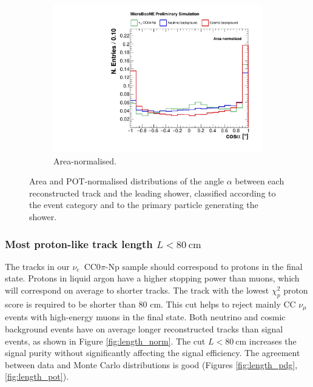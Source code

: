 \begin{figure}[htbp]
    \begin{subfigure}{0.49\textwidth}
    \includegraphics[width=\linewidth]{figures/h_track_shower_angle_norm.pdf}
    \caption{Area-normalised.} \label{fig:angle_integral}
  \end{subfigure}
  \caption{Area and POT-normalised distributions of the angle $\alpha$ between each reconstructed track and the leading shower, classified according to the event category and to the primary particle generating the shower.}
\end{figure}

\subsubsection*{Most proton-like track length $L < 80~\mathrm{cm}$}
The tracks in our $\nu_e$~CC0$\pi$-Np sample should correspond to protons in the final state. Protons in liquid argon have a higher stopping power than muons, which will correspond on average to shorter tracks. The track with the lowest $\chi_{p}^{2}$ proton score is required to be shorter than 80 cm. This cut helps to reject mainly CC $\nu_{\mu}$ events with high-energy muons in the final state. 
Both neutrino and cosmic background events have on average longer reconstructed tracks than signal events, as shown in Figure \ref{fig:length_norm}. The cut $L < 80~$cm increases the signal purity without significantly affecting the signal efficiency. The agreement between data and Monte Carlo distributions is good (Figures \ref{fig:length_pdg}, \ref{fig:length_pot}). %

